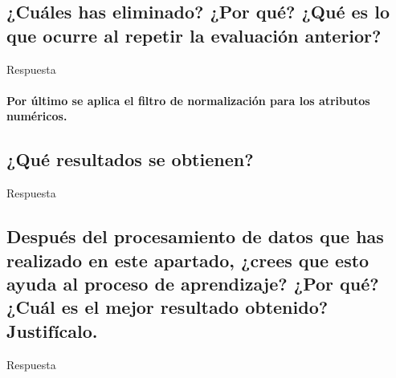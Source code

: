 \documentclass[12pt]{article}
\begin{document}
\subsection{\small ¿Cuáles has eliminado? ¿Por qué? ¿Qué es lo que ocurre al repetir la evaluación anterior?}

Respuesta

\paragraph{\small Por último se aplica el filtro de normalización para los atributos
numéricos.}

\subsection{\small ¿Qué resultados se obtienen?}

Respuesta

\subsection{\small Después del procesamiento de datos que has realizado en este
apartado, ¿crees que esto ayuda al proceso de aprendizaje? ¿Por qué? ¿Cuál es
el mejor resultado obtenido? Justifícalo.}

Respuesta
\end{document}
